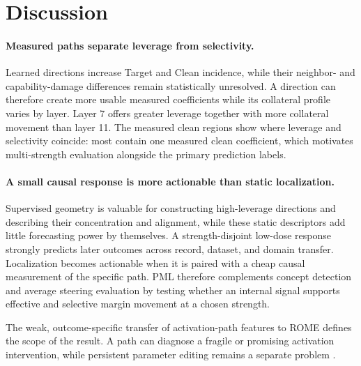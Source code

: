 \section{Discussion}

\paragraph{Measured paths separate leverage from selectivity.}
Learned directions increase Target and Clean incidence, while their
neighbor- and capability-damage differences remain statistically unresolved.
A direction can therefore create more usable measured coefficients while its
collateral profile varies by layer. Layer 7 offers greater leverage together
with more collateral movement than layer 11. The measured clean regions show
where leverage and selectivity coincide: most contain one measured clean
coefficient, which motivates multi-strength evaluation alongside the primary
prediction labels.



\paragraph{A small causal response is more actionable than static localization.}
Supervised geometry is valuable for constructing high-leverage directions and
describing their concentration and alignment, while these static descriptors
add little forecasting power by themselves. A strength-disjoint low-dose
response strongly predicts later outcomes across record, dataset, and domain
transfer. Localization becomes actionable when it is paired with a cheap causal
measurement of the specific path. PML therefore complements concept detection
and average steering evaluation
\citep{wu25a,silva-etal-2025-steering,goyal-iii-2026-steering} by testing
whether an internal signal supports effective and selective margin movement at
a chosen strength.

The weak, outcome-specific transfer of activation-path features to ROME defines
the scope of the result. A path can diagnose a fragile or promising activation
intervention, while persistent parameter editing remains a separate problem
\citep{NEURIPS2023_3927bbdc}.
